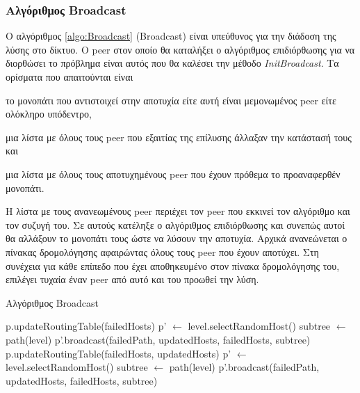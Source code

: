 \subsubsection{Αλγόριθμος Broadcast}
Ο αλγόριθμος \ref{algo:Broadcast} (Broadcast) είναι υπεύθυνος για την διάδοση 
της λύσης στο δίκτυο. Ο peer στον οποίο θα καταλήξει ο αλγόριθμος επιδιόρθωσης %
για να διορθώσει το πρόβλημα είναι αυτός που θα καλέσει την μέθοδο 
\textit{InitBroadcast}. Τα ορίσματα που απαιτούνται είναι 
\begin{inparaenum}
\item το μονοπάτι που αντιστοιχεί στην αποτυχία είτε αυτή είναι μεμονωμένος
peer είτε ολόκληρο υπόδεντρο,
\item μια λίστα με όλους τους peer που εξαιτίας της επίλυσης άλλαξαν την 
κατάστασή τους και
\item μια λίστα με όλους τους αποτυχημένους peer που έχουν πρόθεμα το 
προαναφερθέν μονοπάτι.
\end{inparaenum}
Η λίστα με τους ανανεωμένους peer περιέχει τον peer που εκκινεί τον 
αλγόριθμο και τον συζυγή του. Σε αυτούς κατέληξε ο αλγόριθμος επιδιόρθωσης 
και συνεπώς αυτοί θα αλλάξουν το μονοπάτι τους ώστε να λύσουν την αποτυχία. 
Αρχικά ανανεώνεται ο πίνακας δρομολόγησης αφαιρώντας όλους τους peer που 
έχουν αποτύχει. Στη συνέχεια για κάθε επίπεδο που έχει αποθηκευμένο στον 
πίνακα δρομολόγησης του, επιλέγει τυχαία έναν peer από αυτό και του προωθεί 
την λύση. 

\begin{algorithm}[H]
\caption{Αλγόριθμος Broadcast}
\label{algo:Broadcast}
\begin{algorithmic}[1]
        \State p.updateRoutingTable(failedHosts)
            \State p' $\gets$ level.selectRandomHost()
            \State subtree $\gets$ path(level)
            \State p'.broadcast(failedPath, updatedHosts, failedHosts, subtree)
        \EndFor
    \EndProcedure
    \Statex
        \State p.updateRoutingTable(failedHosts, updatedHosts)
            \State \Return
        \EndIf
            \State p' $\gets$ level.selectRandomHost()
            \State subtree $\gets$ path(level)
            \State p'.broadcast(failedPath, updatedHosts, failedHosts, subtree)
        \EndFor
    \EndProcedure
\end{algorithmic}
\end{algorithm}

